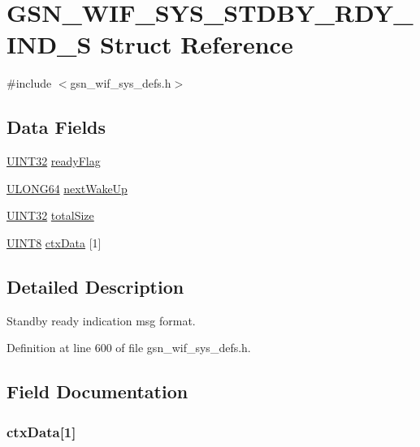 \hypertarget{a00363}{
\section{GSN\_\-WIF\_\-SYS\_\-STDBY\_\-RDY\_\-IND\_\-S Struct Reference}
\label{a00363}
}


{\ttfamily \#include $<$gsn\_\-wif\_\-sys\_\-defs.h$>$}

\subsection*{Data Fields}
\begin{DoxyCompactItemize}
\item 
\hyperlink{a00660_gae1e6edbbc26d6fbc71a90190d0266018}{UINT32} \hyperlink{a00363_a124b70eb42eacdeecd82e36e46b93d59}{readyFlag}
\item 
\hyperlink{a00660_ga28961430434ccabca6862ea93fe9a15b}{ULONG64} \hyperlink{a00363_a760a4ce0d264283e270a3dec2c784fd9}{nextWakeUp}
\item 
\hyperlink{a00660_gae1e6edbbc26d6fbc71a90190d0266018}{UINT32} \hyperlink{a00363_a525677d0cc8dc888ce314ff840778c74}{totalSize}
\item 
\hyperlink{a00660_gab27e9918b538ce9d8ca692479b375b6a}{UINT8} \hyperlink{a00363_a8d939201cfc8a41265ca6a3fada51101}{ctxData} \mbox{[}1\mbox{]}
\end{DoxyCompactItemize}


\subsection{Detailed Description}
Standby ready indication msg format. 

Definition at line 600 of file gsn\_\-wif\_\-sys\_\-defs.h.



\subsection{Field Documentation}
\hypertarget{a00363_a8d939201cfc8a41265ca6a3fada51101}{
\subsubsection[{ctxData}]{ {\bf ctxData}\mbox{[}1\mbox{]}}}
\label{a00363_a8d939201cfc8a41265ca6a3fada51101}


